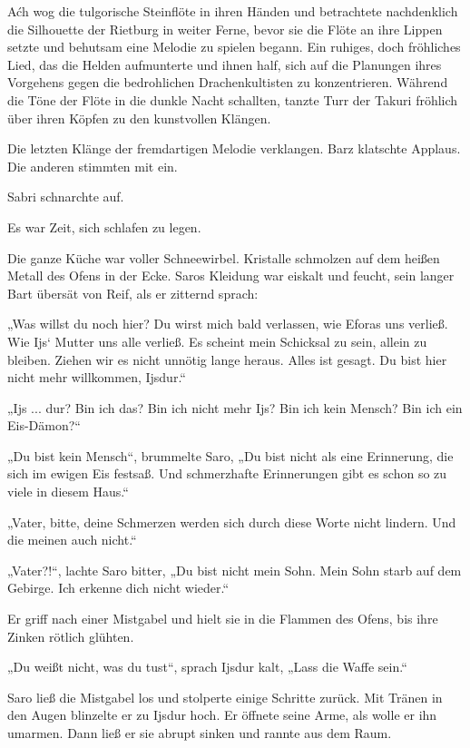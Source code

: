 Aćh wog die tulgorische Steinflöte in ihren Händen und betrachtete nachdenklich die Silhouette der Rietburg in weiter Ferne, bevor sie die Flöte an ihre Lippen setzte und behutsam eine Melodie zu spielen begann. Ein ruhiges, doch fröhliches Lied, das die Helden aufmunterte und ihnen half, sich auf die Planungen ihres Vorgehens gegen die bedrohlichen Drachenkultisten zu konzentrieren. Während die Töne der Flöte in die dunkle Nacht schallten, tanzte Turr der Takuri fröhlich über ihren Köpfen zu den kunstvollen Klängen.

Die letzten Klänge der fremdartigen Melodie verklangen. Barz klatschte Applaus. Die anderen stimmten mit ein.

Sabri schnarchte auf.

Es war Zeit, sich schlafen zu legen.\bigskip







Die ganze Küche war voller Schneewirbel. Kristalle schmolzen auf dem heißen Metall des Ofens in der Ecke. Saros Kleidung war eiskalt und feucht, sein langer Bart übersät von Reif, als er zitternd sprach:

„Was willst du noch hier? Du wirst mich bald verlassen, wie Eforas uns verließ. Wie Ijs‘ Mutter uns alle verließ. Es scheint mein Schicksal zu sein, allein zu bleiben. Ziehen wir es nicht unnötig lange heraus. Alles ist gesagt. Du bist hier nicht mehr willkommen, Ijsdur.“

„Ijs ... dur? Bin ich das? Bin ich nicht mehr Ijs? Bin ich kein Mensch? Bin ich ein Eis-Dämon?“

„Du bist kein Mensch“, brummelte Saro, „Du bist nicht als eine Erinnerung, die sich im ewigen Eis festsaß. Und schmerzhafte Erinnerungen gibt es schon so zu viele in diesem Haus.“

„Vater, bitte, deine Schmerzen werden sich durch diese Worte nicht lindern. Und die meinen auch nicht.“

„Vater?!“, lachte Saro bitter, „Du bist nicht mein Sohn. Mein Sohn starb auf dem Gebirge. Ich erkenne dich nicht wieder.“

Er griff nach einer Mistgabel und hielt sie in die Flammen des Ofens, bis ihre Zinken rötlich glühten.

„Du weißt nicht, was du tust“, sprach Ijsdur kalt, „Lass die Waffe sein.“

Saro ließ die Mistgabel los und stolperte einige Schritte zurück. Mit Tränen in den Augen blinzelte er zu Ijsdur hoch. Er öffnete seine Arme, als wolle er ihn umarmen. Dann ließ er sie abrupt sinken und rannte aus dem Raum.



